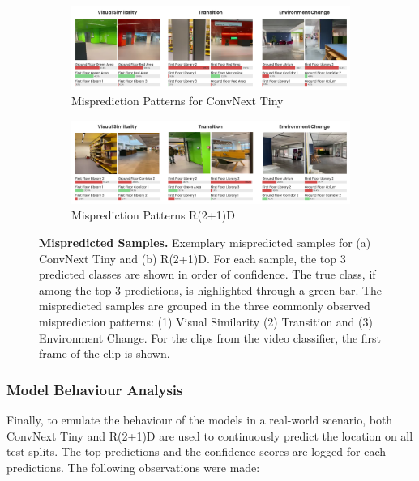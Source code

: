 \documentclass[a4paper]{article}
\begin{document}
\begin{figure}
\centering

\begin{subfigure}[b]{\textwidth}
\centering
\includegraphics[width=\textwidth]{./figures/mispredictions-convext-tiny.png}
\caption{Misprediction Patterns for ConvNext Tiny}
\end{subfigure}

\begin{subfigure}[b]{\textwidth}
\centering
\includegraphics[width=\textwidth]{./figures/mispredictions-r2plus1d.png}
\caption{Misprediction Patterns R(2+1)D}
\end{subfigure}

\caption{\textbf{Mispredicted Samples.} Exemplary mispredicted samples for (a)
  ConvNext Tiny and (b) R(2+1)D. For each sample, the top 3 predicted classes
  are shown in order of confidence. The true class, if among the top 3
  predictions, is highlighted through a green bar. The mispredicted samples are
  grouped in the three commonly observed misprediction patterns: (1) Visual
  Similarity (2) Transition and (3) Environment Change. For the clips from the
  video classifier, the first frame of the clip is shown.}
\label{fig:mispredictions}
\end{figure}


\subsubsection{Model Behaviour Analysis} %
\label{sub:behaviour}

Finally, to emulate the behaviour of the models in a real-world scenario, both
ConvNext Tiny and R(2+1)D are used to continuously predict the location on all
test splits. The top predictions and the confidence scores are logged for each
predictions. The following observations were made:
\end{document}
